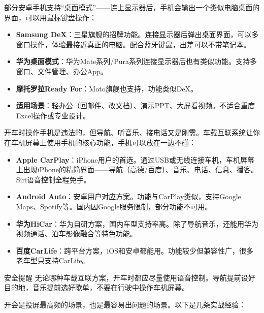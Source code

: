 
部分安卓手机支持“桌面模式”——连上显示器后，手机会输出一个类似电脑桌面的界面，可以用鼠标键盘操作：

\begin{itemize}
  \item \textbf{Samsung DeX}：三星旗舰的招牌功能。连接显示器后弹出桌面界面，可以多窗口操作，体验最接近真正的电脑。配合蓝牙键鼠，出差可以不带笔记本。
  \item \textbf{华为桌面模式}：华为Mate系列/Pura系列连接显示器后也有类似功能。支持多窗口、文件管理、办公App。
  \item \textbf{摩托罗拉Ready For}：Moto旗舰也支持，功能类似DeX。
  \item \textbf{适用场景}：轻办公（回邮件、改文档）、演示PPT、大屏看视频。不适合重度Excel操作或专业设计。
\end{itemize}


开车时操作手机是违法的，但导航、听音乐、接电话又是刚需。车载互联系统让你在车机屏幕上使用手机的核心功能，手机可以放在一边不碰：

\begin{itemize}
  \item \textbf{Apple CarPlay}：iPhone用户的首选。通过USB或无线连接车机，车机屏幕上出现iPhone的精简界面——导航（高德/百度）、音乐、电话、信息、播客。Siri语音控制全程免手。
  \item \textbf{Android Auto}：安卓用户对应方案。功能与CarPlay类似，支持Google Maps、Spotify等。国内因Google服务限制，部分功能不可用。
  \item \textbf{华为HiCar}：华为自研方案，国内车型支持率高。除了导航音乐，还能用华为视频通话、泊车影像融合等特色功能。
  \item \textbf{百度CarLife}：跨平台方案，iOS和安卓都能用。功能较少但兼容性广，很多老车型只支持CarLife。
\end{itemize}

\begin{tcbwarn}{安全提醒}
无论哪种车载互联方案，开车时都应尽量使用语音控制。导航提前设好目的地，音乐提前选好歌单，不要在行驶中操作车机屏幕。

\end{tcbwarn}


开会是投屏最高频的场景，也是最容易出问题的场景。以下是几条实战经验：

